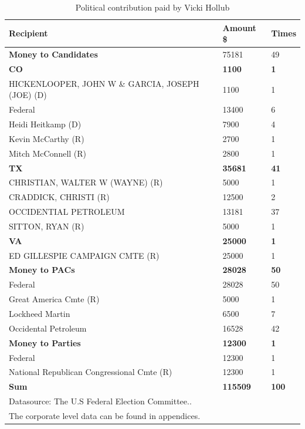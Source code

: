 \documentclass[
	a4paper, %
	12pt,%
]{CSSullivanBusinessReport}
\begin{document}
\begin{fullwidth}
\begin{table}[h]\small
    \centering
    \caption{Political contribution paid by Vicki Hollub}
    \begin{tabular}{lll}
    \hline
        Recipient & Amount \$ & Times \\ \hline
       \textbf{ Money to Candidates} & 75181 & 49 \\ 
        \textbf{{CO}} & \textbf{1100} & \textbf{1} \\ 
        \quad HICKENLOOPER, JOHN W \& GARCIA, JOSEPH (JOE) (D) & 1100 & 1 \\ 
        \quad Federal & 13400 & 6 \\ 
        \quad Heidi Heitkamp (D) & 7900 & 4 \\ 
        \quad Kevin McCarthy (R) & 2700 & 1 \\ 
        \quad Mitch McConnell (R) & 2800 & 1 \\ 
        \textbf{{TX}} & \textbf{35681} & \textbf{41} \\ 
        \quad CHRISTIAN, WALTER W (WAYNE) (R) & 5000 & 1 \\ 
        \quad CRADDICK, CHRISTI (R) & 12500 & 2 \\ 
        \quad OCCIDENTIAL PETROLEUM & 13181 & 37 \\ 
        \quad SITTON, RYAN (R) & 5000 & 1 \\ 
        \textbf{VA} & \textbf{25000} & \textbf{1} \\ 
        \quad ED GILLESPIE CAMPAIGN CMTE (R) & 25000 & 1 \\ 
        \textbf{Money to PACs} & \textbf{28028} & \textbf{50} \\ 
        \quad Federal & 28028 & 50 \\ 
        \quad Great America Cmte (R) & 5000 & 1 \\ 
        \quad Lockheed Martin & 6500 & 7 \\ 
        \quad Occidental Petroleum & 16528 & 42 \\ 
        \textbf{Money to Parties} & \textbf{12300} & \textbf{1} \\ 
        \quad Federal & 12300 & 1 \\ 
        \quad National Republican Congressional Cmte (R) & 12300 & 1 \\ 
        \textbf{Sum} & \textbf{115509} & \textbf{100} \\ \hline
        Datasource: The U.S Federal Election Committee.\cite{politicalcon}. \\
        The corporate level data can be found in appendices.
    \end{tabular}
    

\end{table}
\end{fullwidth}
\end{document}
